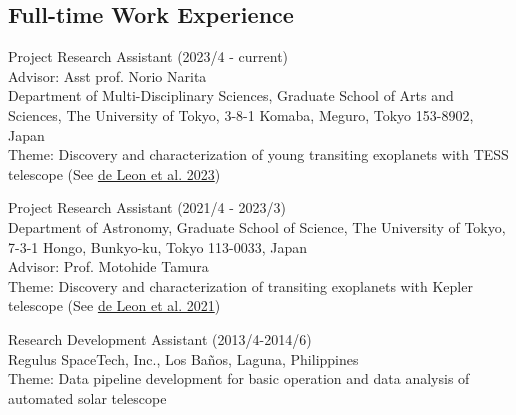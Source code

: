 \documentclass[12pt,letterpaper]{article}
\begin{document}
\subsection{Full-time Work Experience}
\begin{list}{}{\cvlist}
    \item Project Research Assistant (2023/4 - current) \\
        Advisor: Asst prof. Norio Narita \\
        Department of Multi-Disciplinary Sciences, Graduate School of Arts and Sciences, The University of Tokyo, 3-8-1 Komaba, Meguro, Tokyo 153-8902, Japan \\
        Theme: Discovery and characterization of young transiting exoplanets with TESS telescope (See \href{\paperthree}{de Leon et al. 2023})\\
    \item Project Research Assistant (2021/4 - 2023/3) \\
        Department of Astronomy, Graduate School of Science, The University of Tokyo, 7-3-1 Hongo, Bunkyo-ku, Tokyo 113-0033, Japan \\
        Advisor: Prof. Motohide Tamura \\
        Theme: Discovery and characterization of transiting exoplanets with Kepler telescope (See \href{\papertwo}{de Leon et al. 2021}) \\
    \item Research Development Assistant (2013/4-2014/6)\\
        Regulus SpaceTech, Inc., Los Ba\~nos, Laguna, Philippines\\
        Theme: Data pipeline development for basic operation and data analysis of automated solar telescope
\end{list}
\end{document}
